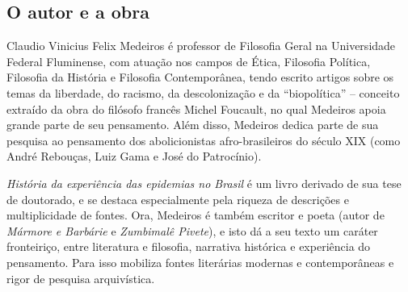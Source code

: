 \documentclass[12pt]{extarticle}
\begin{document}

\subsection{O autor e a obra}


Claudio Vinicius Felix Medeiros é professor de Filosofia Geral na
Universidade Federal Fluminense, com atuação nos campos de Ética,
Filosofia Política, Filosofia da História e Filosofia Contemporânea,
tendo escrito artigos sobre os temas da liberdade, do racismo, da
descolonização e da ``biopolítica'' -- conceito extraído da obra do
filósofo francês Michel Foucault, no qual Medeiros apoia grande parte de
seu pensamento. Além disso, Medeiros dedica parte de sua pesquisa ao
pensamento dos abolicionistas afro-brasileiros do século XIX (como André
Rebouças, Luiz Gama e José do Patrocínio).

\emph{História da experiência das epidemias no Brasil} é um livro
derivado de sua tese de doutorado, e se destaca especialmente pela
riqueza de descrições e multiplicidade de fontes. Ora, Medeiros é também
escritor e poeta (autor de \emph{Mármore e Barbárie} e \emph{Zumbimalê
Pivete}), e isto dá a seu texto um caráter fronteiriço, entre literatura
e filosofia, narrativa histórica e experiência do pensamento. Para isso
mobiliza fontes literárias modernas e contemporâneas e rigor de pesquisa
arquivística.
\end{document}
